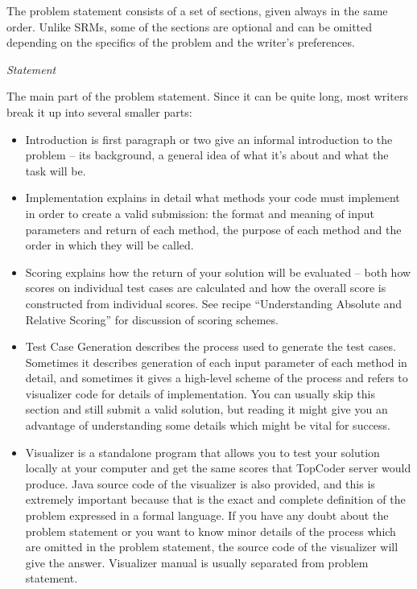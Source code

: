 The problem statement consists of a set of sections, given always in the
same order. Unlike SRMs, some of the sections are optional and can be
omitted depending on the specifics of the problem and the writer's
preferences.

\emph{Statement}

The main part of the problem statement. Since it can be quite long, most
writers break it up into several smaller parts:

\begin{itemize}
\item
  Introduction is first paragraph or two give an informal introduction
  to the problem -- its background, a general idea of what it's about
  and what the task will be.
\item
  Implementation explains in detail what methods your code must
  implement in order to create a valid submission: the format and
  meaning of input parameters and return of each method, the purpose of
  each method and the order in which they will be called.
\item
  Scoring explains how the return of your solution will be evaluated --
  both how scores on individual test cases are calculated and how the
  overall score is constructed from individual scores. See recipe
  ``Understanding Absolute and Relative Scoring'' for discussion of
  scoring schemes.
\item
  Test Case Generation describes the process used to generate the test
  cases. Sometimes it describes generation of each input parameter of
  each method in detail, and sometimes it gives a high-level scheme of
  the process and refers to visualizer code for details of
  implementation. You can usually skip this section and still submit a
  valid solution, but reading it might give you an advantage of
  understanding some details which might be vital for success.
\item
  Visualizer is a standalone program that allows you to test your
  solution locally at your computer and get the same scores that
  TopCoder server would produce. Java source code of the visualizer is
  also provided, and this is extremely important because that is the
  exact and complete definition of the problem expressed in a formal
  language. If you have any doubt about the problem statement or you
  want to know minor details of the process which are omitted in the
  problem statement, the source code of the visualizer will give the
  answer. Visualizer manual is usually separated from problem statement.
\end{itemize}


